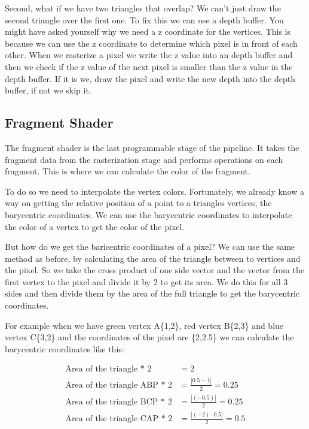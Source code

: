\documentclass[12pt]{report} \usepackage{preamble}
\begin{document}
Second, what if we have two triangles that overlap?
We can't just draw the second triangle over the first one.
To fix this we can use a depth buffer. You might have asked yourself why
we need a z coordinate for the vertices. This is because we can use the z coordinate
to determine which pixel is in front of each other. When we rasterize a pixel
we write the z value into an depth buffer and then we check if the z value of the next pixel is
smaller than the z value in the depth buffer. If it is we, draw the pixel and write the new depth
into the depth buffer, if not we skip it.

\subsection{Fragment Shader}

The fragment shader is the last programmable stage of the pipeline.
It takes the fragment data from the rasterization stage and performs
operations on each fragment. This is where we can calculate the color of the fragment.

To do so we need to interpolate the vertex colors.
Fortunately, we already know a way on getting the relative position
of a point to a triangles vertices, the barycentric coordinates.
We can use the barycentric coordinates to interpolate
the color of a vertex to get the color of the pixel.

But how do we get the baricentric coordinates of a pixel?
We can use the same method as before, by calculating the area of the triangle
between to vertices and the pixel. So we take the cross product of one side vector
and the vector from the first vertex to the pixel
and divide it by 2 to get its area. We do this for all 3 sides and then divide them
by the area of the full triangle to get the barycentric coordinates.

For example when we have green vertex A\{1,2\}, red vertex B\{2,3\}
and blue vertex C\{3,2\} and the coordinates of the pixel are
\{2,2.5\} we can calculate the barycentric coordinates like this:

\[
	\begin{aligned}
		\text{Area of the triangle * 2}     & = 2                                             \\
		\text{Area of the triangle ABP * 2} & = \frac{\left| 0.5 - 1 \right|}{2} = 0.25       \\
		\text{Area of the triangle BCP * 2} & = \frac{\left| (-0.5) \right|}{2} = 0.25        \\
		\text{Area of the triangle CAP * 2} & = \frac{\left| (-2) \cdot 0.5 \right|}{2} = 0.5 \\
	\end{aligned}
\]
\end{document}
